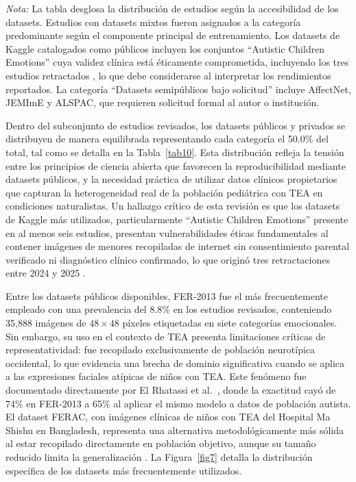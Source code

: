 \documentclass[3p,twocolumn,times]{elsarticle}
\begin{document}
\begin{table}[!ht]
\begin{minipage}{\columnwidth}
			\small\textit{Nota:} La tabla desglosa la distribución de estudios según la
			accesibilidad de los datasets. Estudios con datasets mixtos fueron asignados a la
			categoría predominante según el componente principal de entrenamiento. Los datasets
			de Kaggle catalogados como públicos incluyen los conjuntos ``Autistic Children
			Emotions'' cuya validez clínica está éticamente comprometida, incluyendo los tres
			estudios retractados \cite{Gungor2025,Mahmood2025,Kumar2024}, lo que debe
			considerarse al interpretar los rendimientos reportados. La categoría ``Datasets
			semipúblicos bajo solicitud'' incluye AffectNet, JEMImE y ALSPAC, que requieren
			solicitud formal al autor o institución.
		\end{minipage}
	\end{table}
	
	Dentro del subconjunto de estudios revisados, los datasets públicos y privados se
	distribuyen de manera equilibrada representando cada categoría el 50.0\% del total,
	tal como se detalla en la Tabla~\ref{tab10}. Esta distribución refleja la tensión
	entre los principios de ciencia abierta que favorecen la reproducibilidad mediante
	datasets públicos, y la necesidad práctica de utilizar datos clínicos propietarios
	que capturan la heterogeneidad real de la población pediátrica con TEA en
	condiciones naturalistas. Un hallazgo crítico de esta revisión es que los datasets
	de Kaggle más utilizados, particularmente ``Autistic Children Emotions'' presente
	en al menos seis estudios, presentan vulnerabilidades éticas fundamentales al
	contener imágenes de menores recopiladas de internet sin consentimiento parental
	verificado ni diagnóstico clínico confirmado, lo que originó tres retractaciones
	entre 2024 y 2025 \cite{Gungor2025,Mahmood2025,Kumar2024}.
	
	Entre los datasets públicos disponibles, FER-2013 fue el más frecuentemente
	empleado con una prevalencia del 8.8\% en los estudios revisados, conteniendo
	35{,}888 imágenes de $48\times48$ píxeles etiquetadas en siete categorías
	emocionales. Sin embargo, su uso en el contexto de TEA presenta limitaciones
	críticas de representatividad: fue recopilado exclusivamente de población
	neurotípica occidental, lo que evidencia una brecha de dominio significativa cuando
	se aplica a las expresiones faciales atípicas de niños con TEA. Este fenómeno fue
	documentado directamente por El Rhatassi et al.\ \cite{Rhatassi2024}, donde la
	exactitud cayó de 74\% en FER-2013 a 65\% al aplicar el mismo modelo a datos de
	población autista. El dataset FERAC, con imágenes clínicas de niños con TEA del
	Hospital Ma Shishu en Bangladesh, representa una alternativa metodológicamente más
	sólida al estar recopilado directamente en población objetivo, aunque su tamaño
	reducido limita la generalización \cite{Radocaj2025}. La Figura~\ref{fig7} detalla
	la distribución específica de los datasets más frecuentemente utilizados.
	
\end{document}
